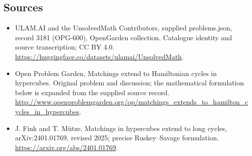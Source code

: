 \documentclass[11pt,a4paper]{article}
\begin{document}
\subsection{Sources}
\begin{itemize}
\item[S1] ULAM.AI and the UnsolvedMath Contributors, supplied problems.json, record 3181 (OPG-600), OpenGarden collection. Catalogue identity and source transcription; CC BY 4.0.
\url{https://huggingface.co/datasets/ulamai/UnsolvedMath}.
\item[S2] Open Problem Garden, Matchings extend to Hamiltonian cycles in hypercubes. Original problem and discussion; the mathematical formulation below is expanded from the supplied source record.
\url{http://www.openproblemgarden.org/op/matchings_extends_to_hamilton_cycles_in_hypercubes}.
\item[S3] J. Fink and T. Mütze, Matchings in hypercubes extend to long cycles, arXiv:2401.01769, revised 2025; precise Ruskey–Savage formulation.
\url{https://arxiv.org/abs/2401.01769}.

\end{itemize}
\end{document}
